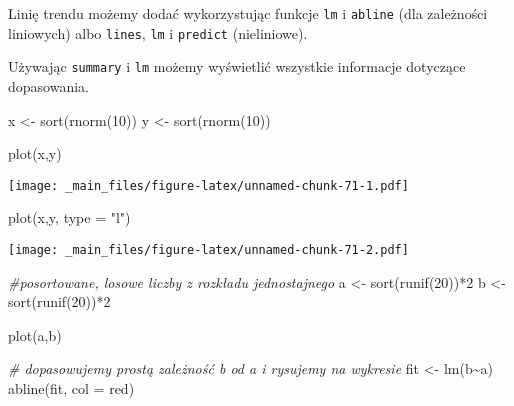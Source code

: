 \documentclass[
]{book}
\newenvironment{Shaded}{\begin{snugshade}}{\end{snugshade}}
\newcommand{\AttributeTok}[1]{\textcolor[rgb]{0.77,0.63,0.00}{#1}}
\newcommand{\CommentTok}[1]{\textcolor[rgb]{0.56,0.35,0.01}{\textit{#1}}}
\newcommand{\DecValTok}[1]{\textcolor[rgb]{0.00,0.00,0.81}{#1}}
\newcommand{\FunctionTok}[1]{\textcolor[rgb]{0.00,0.00,0.00}{#1}}
\newcommand{\NormalTok}[1]{#1}
\newcommand{\OtherTok}[1]{\textcolor[rgb]{0.56,0.35,0.01}{#1}}
\newcommand{\SpecialCharTok}[1]{\textcolor[rgb]{0.00,0.00,0.00}{#1}}
\newcommand{\StringTok}[1]{\textcolor[rgb]{0.31,0.60,0.02}{#1}}
\begin{document}
Linię trendu możemy dodać wykorzystując funkcje \texttt{lm} i \texttt{abline} (dla zależności liniowych) albo \texttt{lines}, \texttt{lm} i \texttt{predict} (nieliniowe).

Używając \texttt{summary} i \texttt{lm} możemy wyświetlić wszystkie informacje dotyczące dopasowania.

\begin{Shaded}
\begin{Highlighting}[]
\NormalTok{x }\OtherTok{\textless{}{-}} \FunctionTok{sort}\NormalTok{(}\FunctionTok{rnorm}\NormalTok{(}\DecValTok{10}\NormalTok{))}
\NormalTok{y }\OtherTok{\textless{}{-}} \FunctionTok{sort}\NormalTok{(}\FunctionTok{rnorm}\NormalTok{(}\DecValTok{10}\NormalTok{))}

\FunctionTok{plot}\NormalTok{(x,y)}
\end{Highlighting}
\end{Shaded}

\texttt{[image: \_main\_files/figure-latex/unnamed-chunk-71-1.pdf]}

\begin{Shaded}
\begin{Highlighting}[]
\FunctionTok{plot}\NormalTok{(x,y, }\AttributeTok{type =} \StringTok{"l"}\NormalTok{)}
\end{Highlighting}
\end{Shaded}

\texttt{[image: \_main\_files/figure-latex/unnamed-chunk-71-2.pdf]}

\begin{Shaded}
\begin{Highlighting}[]
\CommentTok{\#posortowane, losowe liczby z rozkładu jednostajnego}
\NormalTok{a }\OtherTok{\textless{}{-}} \FunctionTok{sort}\NormalTok{(}\FunctionTok{runif}\NormalTok{(}\DecValTok{20}\NormalTok{))}\SpecialCharTok{*}\DecValTok{2}
\NormalTok{b }\OtherTok{\textless{}{-}} \FunctionTok{sort}\NormalTok{(}\FunctionTok{runif}\NormalTok{(}\DecValTok{20}\NormalTok{))}\SpecialCharTok{*}\DecValTok{2}

\FunctionTok{plot}\NormalTok{(a,b)}

\CommentTok{\# dopasowujemy prostą zależność b od a i rysujemy na wykresie}
\NormalTok{fit }\OtherTok{\textless{}{-}} \FunctionTok{lm}\NormalTok{(b}\SpecialCharTok{\textasciitilde{}}\NormalTok{a)}
\FunctionTok{abline}\NormalTok{(fit, }\AttributeTok{col =} \StringTok{\textquotesingle{}red\textquotesingle{}}\NormalTok{)}
\end{Highlighting}
\end{Shaded}
\end{document}
